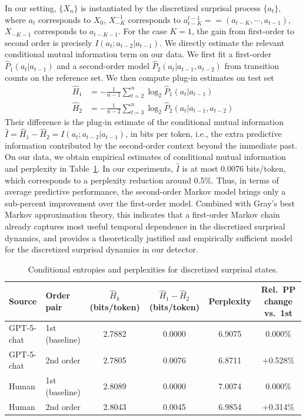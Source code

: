 \documentclass{article}
\theoremstyle{plain}
\theoremstyle{definition}
\theoremstyle{remark}
\begin{document}
In our setting, $\{X_n\}$ is instantiated by the discretized surprisal process $\{a_t\}$, where $a_t$ corresponds to $X_0$, $X_{-K}^{-1}$ corresponds to $a_{t-K}^{t-1}==(a_{t-K},\cdots, a_{t-1})$, $X_{-K-1}$ corresponds to $a_{t-K-1}$. For the case $K=1$, the gain from first-order to second order is precisely $I(a_t;a_{t-2}|a_{t-1})$. We directly estimate the relevant conditional mutual information term on our data. We first fit a first-order $\hat{P}_1(a_t|a_{t-1})$ and a second-order model $\hat{P}_2(a_t|a_{t-1},a_{t-2})$ from transition counts on the reference set. We then compute plug-in estimates on test set
\begin{align}
\hat{H}_1 &= -\frac{1}{n-1}\sum_{t=2}^{n}\log_2 \hat{P}_1(a_t|a_{t-1}) \\
\hat{H}_2 &= -\frac{1}{n-2}\sum_{t=3}^{n}\log_2 \hat{P}_2(a_t|a_{t-1},a_{t-2})
\end{align}
Their difference is the plug-in estimate of the conditional mutual information $\hat{I}=\hat{H}_1-\hat{H}_2=I(a_t;a_{t-2}|a_{t-1})$, in bits per token, i.e., the extra predictive information contributed by the second-order context beyond the immediate past. On our data, we obtain empirical estimates of conditional mutual information and perplexity in Table~\ref{tab:cond-entropy-perplexity}. In our experiments, $\hat I$ is at most 0.0076 bits/token, which corresponds to a perplexity reduction around 0.5\%.  Thus, in terms of average predictive performance, the second-order Markov model brings only a sub-percent improvement over the first-order model. Combined with Gray's best Markov approximation theory, this indicates that a first-order Markov chain already captures most useful temporal dependence in the discretized surprisal dynamics, and provides a theoretically justified and empirically sufficient model for the discretized surprisal dynamics in our detector.

\begin{table}[htbp]
\centering
{\scriptsize
\begin{tabular}{l l c c c c}
\toprule
Source      & Order pair      & $\hat H_k$ (bits/token) & $\hat H_1 - \hat H_2$ (bits/token) & Perplexity & Rel.\ PP change vs.\ 1st \\
\midrule
GPT-5-chat  & 1st (baseline)  & 2.7882                  & 0.0000                              & 6.9075     & 0.000\%                 \\
GPT-5-chat  & 2nd order       & 2.7805                  & 0.0076                              & 6.8711     & +0.528\%                \\
Human       & 1st (baseline)  & 2.8089                  & 0.0000                              & 7.0074     & 0.000\%                 \\
Human       & 2nd order       & 2.8043                  & 0.0045                              & 6.9854     & +0.314\%                \\
\bottomrule
\end{tabular}}
\caption{Conditional entropies and perplexities for discretized surprisal states.}
\label{tab:cond-entropy-perplexity}
\end{table}
\end{document}
